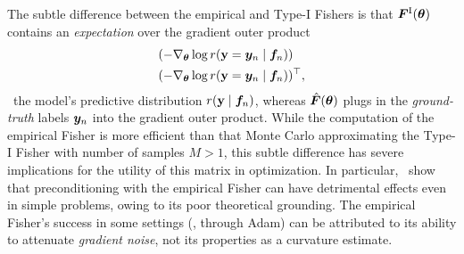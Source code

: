 The subtle difference between the empirical and Type-I Fishers is that
${\bm{F}}^\text{I}({\bm{\theta}})$ contains an \emph{expectation} over the gradient
outer product
\begin{align*}
  &(-\nabla_{{\bm{\theta}}} \log r({\mathbf{y}} = {\bm{y}}_n \mid {\bm{f}}_n)) \\
  &(-\nabla_{{\bm{\theta}}} \log r({\mathbf{y}} = {\bm{y}}_n \mid {\bm{f}}_n))^{\top},
\end{align*}
\wrt~the model's predictive distribution $r({\mathbf{y}} \mid {\bm{f}}_n)$,
whereas $\hat{{\bm{F}}}({\bm{\theta}})$ plugs in the \emph{ground-truth} labels ${\bm{y}}_n$
into the gradient outer product. While the computation of the empirical Fisher
is more efficient than that Monte Carlo approximating the Type-I Fisher with
number of samples $M > 1$, this subtle difference
has severe implications for the utility of this matrix in optimization.
In particular,~\citet{kunstner2019limitations} show that preconditioning with
the empirical Fisher can have detrimental effects even in simple problems,
owing to its poor theoretical grounding. The empirical Fisher's success
in some settings (\eg, through Adam) can be attributed to its ability to attenuate
\emph{gradient noise}, not its properties as a curvature estimate.
